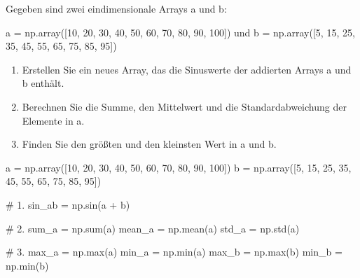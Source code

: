 \documentclass[
  letterpaper,
  DIV=11,
  numbers=noendperiod]{scrreprt}
\newenvironment{Shaded}{\begin{snugshade}}{\end{snugshade}}
\newcommand{\BuiltInTok}[1]{\textcolor[rgb]{0.00,0.23,0.31}{#1}}
\newcommand{\CommentTok}[1]{\textcolor[rgb]{0.37,0.37,0.37}{#1}}
\newcommand{\DecValTok}[1]{\textcolor[rgb]{0.68,0.00,0.00}{#1}}
\newcommand{\NormalTok}[1]{\textcolor[rgb]{0.00,0.23,0.31}{#1}}
\newcommand{\OperatorTok}[1]{\textcolor[rgb]{0.37,0.37,0.37}{#1}}
\providecommand{\tightlist}{%
  \setlength{\itemsep}{0pt}\setlength{\parskip}{0pt}}\usepackage{longtable,booktabs,array}
\begin{document}
\begin{tcolorbox}
\begin{tcolorbox}
Gegeben sind zwei eindimensionale Arrays a und b:

a = np.array({[}10, 20, 30, 40, 50, 60, 70, 80, 90, 100{]}) und b =
np.array({[}5, 15, 25, 35, 45, 55, 65, 75, 85, 95{]})

\begin{enumerate}
\def\labelenumi{\arabic{enumi}.}
\tightlist
\item
  Erstellen Sie ein neues Array, das die Sinuswerte der addierten Arrays
  a und b enthält.
\item
  Berechnen Sie die Summe, den Mittelwert und die Standardabweichung der
  Elemente in a.
\item
  Finden Sie den größten und den kleinsten Wert in a und b.
\end{enumerate}

\begin{tcolorbox}[enhanced jigsaw, breakable, opacityback=0, left=2mm, coltitle=black, leftrule=.75mm, colframe=quarto-callout-caution-color-frame, opacitybacktitle=0.6, toprule=.15mm, bottomtitle=1mm, titlerule=0mm, toptitle=1mm, title={Lösung}, colbacktitle=quarto-callout-caution-color!10!white, arc=.35mm, bottomrule=.15mm, rightrule=.15mm, colback=white]

\begin{Shaded}
\begin{Highlighting}[]
\NormalTok{a }\OperatorTok{=}\NormalTok{ np.array([}\DecValTok{10}\NormalTok{, }\DecValTok{20}\NormalTok{, }\DecValTok{30}\NormalTok{, }\DecValTok{40}\NormalTok{, }\DecValTok{50}\NormalTok{, }\DecValTok{60}\NormalTok{, }\DecValTok{70}\NormalTok{, }\DecValTok{80}\NormalTok{, }\DecValTok{90}\NormalTok{, }\DecValTok{100}\NormalTok{])}
\NormalTok{b }\OperatorTok{=}\NormalTok{ np.array([}\DecValTok{5}\NormalTok{, }\DecValTok{15}\NormalTok{, }\DecValTok{25}\NormalTok{, }\DecValTok{35}\NormalTok{, }\DecValTok{45}\NormalTok{, }\DecValTok{55}\NormalTok{, }\DecValTok{65}\NormalTok{, }\DecValTok{75}\NormalTok{, }\DecValTok{85}\NormalTok{, }\DecValTok{95}\NormalTok{])}

\CommentTok{\# 1.}
\NormalTok{sin\_ab }\OperatorTok{=}\NormalTok{ np.sin(a }\OperatorTok{+}\NormalTok{ b)}

\CommentTok{\# 2.}
\NormalTok{sum\_a }\OperatorTok{=}\NormalTok{ np.}\BuiltInTok{sum}\NormalTok{(a)}
\NormalTok{mean\_a }\OperatorTok{=}\NormalTok{ np.mean(a)}
\NormalTok{std\_a }\OperatorTok{=}\NormalTok{ np.std(a)}

\CommentTok{\# 3.}
\NormalTok{max\_a }\OperatorTok{=}\NormalTok{ np.}\BuiltInTok{max}\NormalTok{(a)}
\NormalTok{min\_a }\OperatorTok{=}\NormalTok{ np.}\BuiltInTok{min}\NormalTok{(a)}
\NormalTok{max\_b }\OperatorTok{=}\NormalTok{ np.}\BuiltInTok{max}\NormalTok{(b)}
\NormalTok{min\_b }\OperatorTok{=}\NormalTok{ np.}\BuiltInTok{min}\NormalTok{(b)}
\end{Highlighting}
\end{Shaded}


\end{tcolorbox}
\end{tcolorbox}
\end{tcolorbox}
\end{document}
